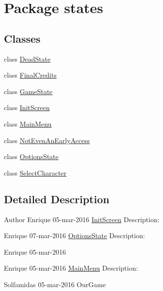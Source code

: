 \hypertarget{namespacestates}{}\section{Package states}
\label{namespacestates}
\subsection*{Classes}
\begin{DoxyCompactItemize}
\item 
class \mbox{\hyperlink{classstates_1_1_dead_state}{Dead\+State}}
\item 
class \mbox{\hyperlink{classstates_1_1_final_credits}{Final\+Credits}}
\item 
class \mbox{\hyperlink{classstates_1_1_game_state}{Game\+State}}
\item 
class \mbox{\hyperlink{classstates_1_1_init_screen}{Init\+Screen}}
\item 
class \mbox{\hyperlink{classstates_1_1_main_menu}{Main\+Menu}}
\item 
class \mbox{\hyperlink{classstates_1_1_not_even_an_early_access}{Not\+Even\+An\+Early\+Access}}
\item 
class \mbox{\hyperlink{classstates_1_1_options_state}{Options\+State}}
\item 
class \mbox{\hyperlink{classstates_1_1_select_character}{Select\+Character}}
\end{DoxyCompactItemize}


\subsection{Detailed Description}
\begin{DoxyAuthor}{Author}
Enrique  05-\/mar-\/2016  \mbox{\hyperlink{classstates_1_1_init_screen}{Init\+Screen}} Description\+:

Enrique  07-\/mar-\/2016  \mbox{\hyperlink{classstates_1_1_options_state}{Options\+State}} Description\+:

Enrique  05-\/mar-\/2016

Enrique  05-\/mar-\/2016  \mbox{\hyperlink{classstates_1_1_main_menu}{Main\+Menu}} Description\+:

Solfamidas  05-\/mar-\/2016  Our\+Game 
\end{DoxyAuthor}
